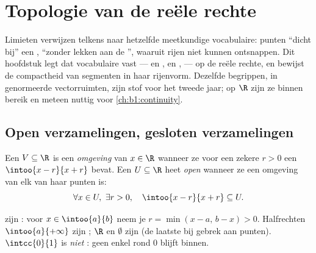 \chapter{Topologie van de reële rechte}\label{ch:b1:topology}

Limieten verwijzen telkens naar hetzelfde meetkundige vocabulaire:
punten ``dicht bij'' een ,  ``zonder lekken aan
de '',  waaruit rijen niet kunnen ontsnappen. Dit
hoofdstuk legt dat vocabulaire vast ---  en ,
 en ,  --- op de reële rechte, en bewijst de
compactheid van segmenten in haar rijenvorm. Dezelfde begrippen, in
genormeerde vectorruimten, zijn stof voor het tweede jaar; op $\R$ zijn
ze binnen bereik en meteen nuttig voor \cref{ch:b1:continuity}.

\section{Open verzamelingen, gesloten verzamelingen}

\begin{definition}\label{def:b1:topology:open}
Een  $V \subseteq \R$ is een \emph{omgeving}
van $x \in \R$ wanneer ze voor een zekere $r > 0$ een  $\intoo{x
- r}{x + r}$ bevat. Een  $U \subseteq \R$ heet
\emph{open} wanneer ze een omgeving van elk van
haar punten is:
\[
\forall x \in U,\ \exists r > 0, \quad \intoo{x - r}{x + r}
\subseteq U .
\]
\end{definition}

\begin{example}\label{ex:b1:topology:open}
  zijn : voor $x \in \intoo{a}{b}$ neem je $r =
\min(x - a,\, b - x) > 0$. Halfrechten $\intoo{a}{+\infty}$ zijn ;
$\R$ en $\emptyset$ zijn  (de laatste bij gebrek aan punten).
$\intcc{0}{1}$ is \emph{niet} : geen enkel  rond $0$ blijft
binnen.
\end{example}

